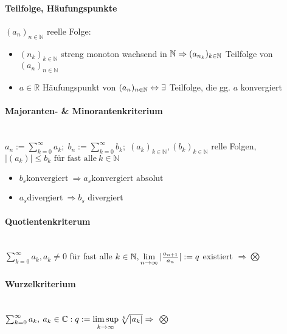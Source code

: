 \documentclass[paper=a3,paper=landscape, fontsize=9pt, DIV=30]{scrartcl}
\newcommand{\real}{{\mathbb{R}}}
\newcommand{\compl}{\mathbb{C}}
\newcommand{\nat}{\mathbb{N}}
\newcommand{\aseq}{(a_n)_{n \in \nat}}
\begin{document}
\begin{multicols*}{4}
  \paragraph{Teilfolge, Häufungspunkte}
  $\aseq$ reelle Folge:
  \begin{itemize}
  	\item $(n_k)_{k \in \nat}$ streng monoton wachsend in $\nat \\\Rightarrow (a_{n_k})_{k \in \nat}$ Teilfolge von $\aseq$
  	\item $a \in \real$ Häufungspunkt von $\aseq \Leftrightarrow\\\exists$ Teilfolge, die gg. $a$ konvergiert
  \end{itemize}

  \paragraph{Majoranten- \& Minorantenkriterium}\hspace{0pt} \\
  $  a_n := \sum_{k=0}^{\infty} a_k; \; b_n := \sum_{k=0}^{\infty} b_k;\; (a_k)_{k \in \nat}, (b_k)_{k \in \nat}$ relle Folgen,\\
  $|(a_k)| \leq b_k \text{ für fast alle}\ k \in \nat$
  \begin{itemize}
  \item $b_s \text{konvergiert}\ \Rightarrow a_s \text{konvergiert absolut}$
  \item $a_s \text{divergiert}\ \Rightarrow b_s$ divergiert
  \end{itemize}

  \paragraph{Quotientenkriterum}\hspace{0pt} \\
  $ \sum_{k=0}^{\infty} a_k, a_k \neq 0$ für fast alle $k \in \nat, \lim\limits_{n \rightarrow \infty} \arrowvert \frac{a_{n+1}}{a_n} \arrowvert := q$ existiert $\Rightarrow \bigotimes$

  \paragraph{Wurzelkriterium}\hspace{0pt} \\
  $ \sum_{k=0}^{\infty} a_k,\:a_k \in \compl: q := \limsup\limits_{k \rightarrow \infty} \sqrt[k]{\arrowvert a_k \arrowvert} \Rightarrow$ $\bigotimes$


\end{multicols*}
\end{document}
